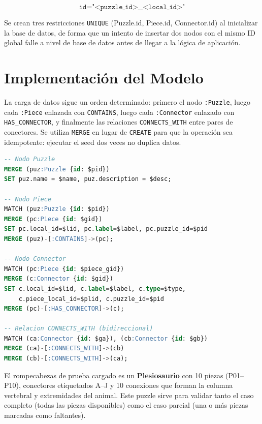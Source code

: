 \documentclass[12pt,a4paper]{article}
\begin{document}
\[
    \texttt{id} = \texttt{"<puzzle\_id>\_\_<local\_id>"}
\]

Se crean tres restricciones \texttt{UNIQUE} (Puzzle.id, Piece.id, Connector.id)
al inicializar la base de datos, de forma que un intento de insertar dos nodos
con el mismo ID global falle a nivel de base de datos antes de llegar a la
lógica de aplicación.

\section{Implementación del Modelo}

La carga de datos sigue un orden determinado: primero el nodo \texttt{:Puzzle},
luego cada \texttt{:Piece} enlazada con \texttt{CONTAINS}, luego cada
\texttt{:Connector} enlazado con \texttt{HAS\_CONNECTOR}, y finalmente las
relaciones \texttt{CONNECTS\_WITH} entre pares de conectores. Se utiliza
\texttt{MERGE} en lugar de \texttt{CREATE} para que la operación sea idempotente:
ejecutar el seed dos veces no duplica datos.

\begin{lstlisting}[language=SQL, caption={Inserción de un rompecabezas en Neo4j}]
-- Nodo Puzzle
MERGE (puz:Puzzle {id: $pid})
SET puz.name = $name, puz.description = $desc;

-- Nodo Piece
MATCH (puz:Puzzle {id: $pid})
MERGE (pc:Piece {id: $gid})
SET pc.local_id=$lid, pc.label=$label, pc.puzzle_id=$pid
MERGE (puz)-[:CONTAINS]->(pc);

-- Nodo Connector
MATCH (pc:Piece {id: $piece_gid})
MERGE (c:Connector {id: $gid})
SET c.local_id=$lid, c.label=$label, c.type=$type,
    c.piece_local_id=$plid, c.puzzle_id=$pid
MERGE (pc)-[:HAS_CONNECTOR]->(c);

-- Relacion CONNECTS_WITH (bidireccional)
MATCH (ca:Connector {id: $ga}), (cb:Connector {id: $gb})
MERGE (ca)-[:CONNECTS_WITH]->(cb)
MERGE (cb)-[:CONNECTS_WITH]->(ca);
\end{lstlisting}

El rompecabezas de prueba cargado es un \textbf{Plesiosaurio} con 10 piezas
(P01--P10), conectores etiquetados A--J y 10 conexiones que forman la columna
vertebral y extremidades del animal. Este puzzle sirve para validar tanto el
caso completo (todas las piezas disponibles) como el caso parcial (una o más
piezas marcadas como faltantes).

\end{document}
